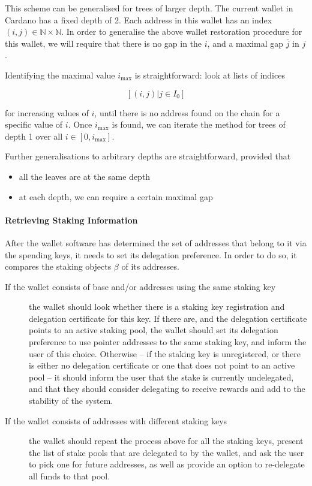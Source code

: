 \documentclass[11pt,a4paper]{article}
\begin{document}
This scheme can be generalised for trees of larger depth. The current
wallet in Cardano has a fixed depth of 2. Each address in this wallet
has an index \((i, j) \in \mathbb{N} \times \mathbb{N}\). In order to
generalise the above wallet restoration procedure for this wallet, we
will require that there is no gap in the \(i\), and a maximal gap
\(\bar{j}\) in \(j\).

Identifying the maximal value \(i_\text{max}\) is straightforward: look
at lists of indices

\[
[(i, j) | j \in I_0]
\]

for increasing values of \(i\), until there is no address found on the
chain for a specific value of \(i\). Once \(i_\text{max}\) is found, we
can iterate the method for trees of depth 1 over all
\(i \in [0, i_\text{max}]\).

Further generalisations to arbitrary depths are straightforward,
provided that

\begin{itemize}
\item
  all the leaves are at the same depth
\item
  at each depth, we can require a certain maximal gap
\end{itemize}

\paragraph{Retrieving Staking Information}
\label{retrieving-staking-information}

After the wallet software has determined the set of addresses that
belong to it via the spending keys, it needs to set its delegation
preference. In order to do so, it compares the staking objects \(\beta\)
of its addresses.

\begin{description}
\item[If the wallet consists of base and/or addresses using the same
  staking key] the wallet should look whether there is a staking key
  registration and delegation certificate for this key. If there are,
  and the delegation certificate points to an active staking pool, the
  wallet should set its delegation preference to use pointer addresses
  to the same staking key, and inform the user of this
  choice. Otherwise -- if the staking key is unregistered, or there is
  either no delegation certificate or one that does not point to an
  active pool -- it should inform the user that the stake is currently
  undelegated, and that they should consider delegating to receive
  rewards and add to the stability of the system.

\item[If the wallet consists of addresses with different staking keys]
  the wallet should repeat the process above for all the staking keys,
  present the list of stake pools that are delegated to by the wallet,
  and ask the user to pick one for future addresses, as well as
  provide an option to re-delegate all funds to that pool.
\end{description}
\end{document}
